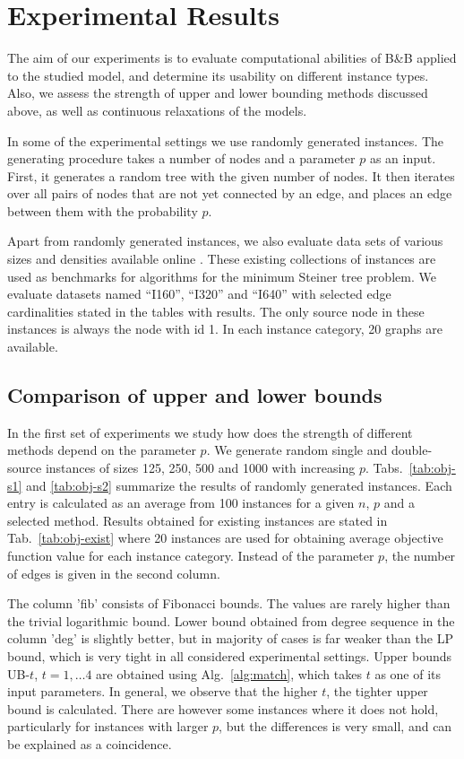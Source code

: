 \section{Experimental Results} \label{sec:exp}

The aim of our experiments is to evaluate computational abilities of B\&B applied to the studied model, and determine its usability on different instance types.
Also, we assess the strength of upper and lower bounding methods discussed above, as well as continuous relaxations of the models.

In some of the experimental settings we use randomly generated instances.
The generating procedure takes a number of nodes and a parameter $p$ as an input.
First, it generates a random tree with the given number of nodes.
It then iterates over all pairs of nodes that are not yet connected by an edge, and places an edge between them with the probability $p$.

Apart from randomly generated instances, we also evaluate data sets of various sizes and densities available online \cite{steinlib}.
These existing collections of instances are used as benchmarks for algorithms for the minimum Steiner tree problem.
We evaluate datasets named ``I160'', ``I320'' and ``I640'' with selected edge cardinalities stated in the tables with results.
The only source node in these instances is always the node with id 1.
In each instance category, 20 graphs are available.

\subsection{Comparison of upper and lower bounds}

In the first set of experiments we study how does the strength of different methods depend on the parameter $p$.
We generate random single and double-source instances of sizes 125, 250, 500 and 1000 with increasing $p$.
Tabs.~\ref{tab:obj-s1} and \ref{tab:obj-s2} summarize the results of randomly generated instances.
Each entry is calculated as an average from 100 instances for a given $n$, $p$ and a selected method.
Results obtained for existing instances are stated in Tab.~\ref{tab:obj-exist} where 20 instances are used for obtaining average objective function value for each instance category.
Instead of the parameter $p$, the number of edges is given in the second column.

The column 'fib' consists of Fibonacci bounds.
The values are rarely higher than the trivial logarithmic bound.
Lower bound obtained from degree sequence in the column 'deg' is slightly better, 
but in majority of cases is far weaker than the LP bound, which is very tight in all considered experimental settings.
Upper bounds UB-$t$, $t=1,\dots 4$ are obtained using Alg.~\ref{alg:match}, which takes $t$ as one of its input parameters.
In general, we observe that the higher $t$, the tighter upper bound is calculated.
There are however some instances where it does not hold, particularly for instances with larger $p$,  but the differences is very small, and can be explained as a coincidence.

